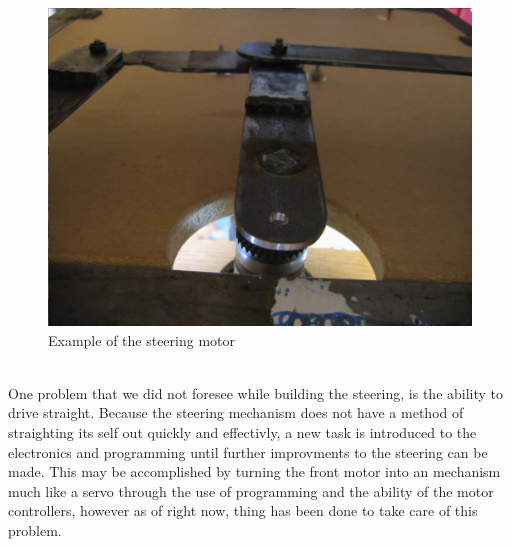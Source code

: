 \documentclass{article}
\begin{document}
\begin{figure}[htp]
  \begin{center}
\includegraphics[scale=0.5]{steeringmotor}
  \end{center}
  \caption{Example of the steering motor}
\label{steeringmotor}
\end{figure}\\
One problem that we did not foresee while building the steering, is the ability to drive straight. Because the steering mechanism does not have a method of straighting its self out quickly and effectivly, a new task is introduced to the electronics and programming until further improvments to the steering can be made. This may be accomplished by turning the front motor into an mechanism much like a servo through the use of programming and the ability of the motor controllers, however as of right now, thing has been done to take care of this problem.\\
\end{document}
